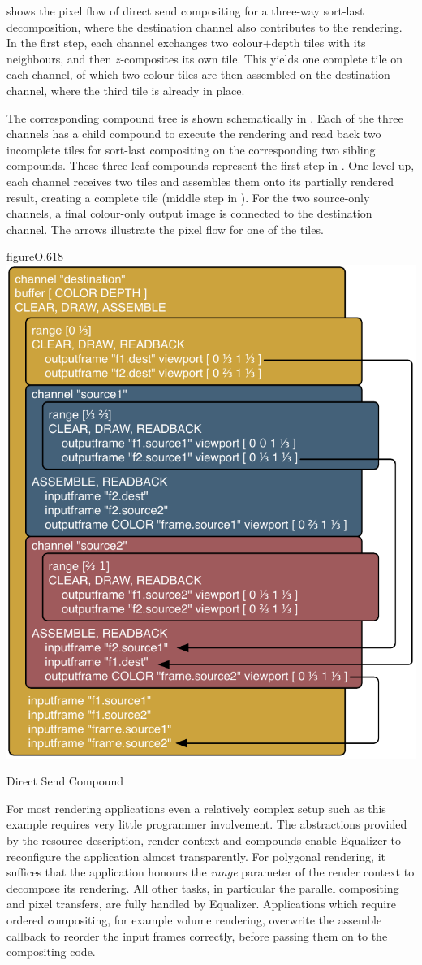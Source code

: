  shows the pixel flow of direct send compositing for a three-way
sort-last decomposition, where the destination channel also contributes to the
rendering. In the first step, each channel exchanges two colour$+$depth tiles with
its neighbours, and then $z$-composites its own tile. This yields one complete
tile on each channel, of which two colour tiles are then assembled on the
destination channel, where the third tile is already in place.

The corresponding compound tree is shown schematically in .
Each of the three channels has a child compound to execute the rendering and
read back two incomplete tiles for sort-last compositing on the corresponding
two sibling compounds. These three leaf compounds represent the first step in
. One level up, each channel receives two tiles and assembles
them onto its partially rendered result, creating a complete tile (middle step
in ). For the two source-only channels, a final colour-only
output image is connected to the destination channel. The arrows illustrate the
pixel flow for one of the tiles.

\begin{wrapfloat}{figure}{O}{.618\textwidth}
  \includegraphics[width=.618\textwidth]{images/directSendCompound}
  {\caption{\label{fDirectSendCmp}Direct Send Compound}}
\end{wrapfloat}

For most rendering applications even a relatively complex setup such as this
example requires very little programmer involvement. The abstractions provided
by the resource description, render context and compounds enable Equalizer to
reconfigure the application almost transparently. For polygonal rendering, it
suffices that the application honours the {\em range} parameter of the render
context to decompose its rendering. All other tasks, in particular the parallel
compositing and pixel transfers, are fully handled by Equalizer. Applications
which require ordered compositing, for example volume rendering, overwrite the
assemble callback to reorder the input frames correctly, before passing them on
to the compositing code.


